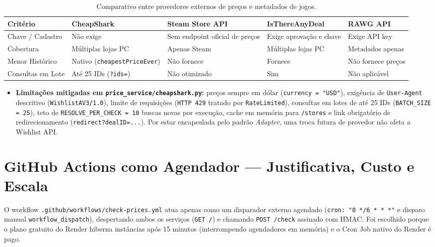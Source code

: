 \documentclass[11pt,a4paper]{article}
\begin{document}
\begin{table}[H]
\centering
\caption{Comparativo entre provedores externos de preços e metadados de jogos.}
\label{tab:cheapshark}
\footnotesize
\begin{tabularx}{\textwidth}{@{}l Y Y Y Y@{}}
\toprule
\textbf{Critério} & \textbf{CheapShark} & \textbf{Steam Store API} & \textbf{IsThereAnyDeal} & \textbf{RAWG API} \\
\midrule
Chave / Cadastro & Não exige & Sem endpoint oficial de preços & Exige aprovação e chave & Exige API key \\
Cobertura & Múltiplas lojas PC & Apenas Steam & Múltiplas lojas PC & Metadados apenas \\
Menor Histórico & Nativo (\texttt{cheapestPriceEver}) & Não fornece & Fornece & Não fornece preços \\
Consultas em Lote & Até 25 IDs (\texttt{?ids=}) & Não otimizado & Sim & Não aplicável \\
\bottomrule
\end{tabularx}
\end{table}

\begin{itemize}
    \item \textbf{Limitações mitigadas em \texttt{price\_service/cheapshark.py}:} preços sempre em dólar (\texttt{currency = "USD"}), exigência de \texttt{User-Agent} descritivo (\texttt{WishlistAV3/1.0}), limite de requisições (\texttt{HTTP 429} tratado por \texttt{RateLimited}), consultas em lotes de até 25 IDs (\texttt{BATCH\_SIZE = 25}), teto de \texttt{RESOLVE\_PER\_CHECK = 10} buscas novas por execução, cache em memória para \texttt{/stores} e link obrigatório de redirecionamento (\texttt{redirect?dealID=...}). Por estar encapsulada pelo padrão \textit{Adapter}, uma troca futura de provedor não afeta a Wishlist API.
\end{itemize}

\section{GitHub Actions como Agendador — Justificativa, Custo e Escala}

O workflow \texttt{.github/workflows/check-prices.yml} atua apenas como um disparador externo agendado (\texttt{cron: "0 */6 * * *"} e disparo manual \texttt{workflow\_dispatch}), despertando ambos os serviços (\texttt{GET /}) e chamando \texttt{POST /check} assinado com HMAC. Foi escolhido porque o plano gratuito do Render hiberna instâncias após 15 minutos (interrompendo agendadores em memória) e o Cron Job nativo do Render é pago.
\end{document}
